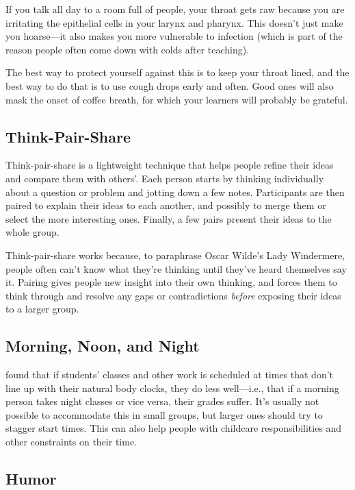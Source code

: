 If you talk all day to a room full of people, your throat gets raw
because you are irritating the epithelial cells in your larynx and
pharynx. This doesn't just make you hoarse---it also makes you more
vulnerable to infection (which is part of the reason people often come
down with colds after teaching).

The best way to protect yourself against this is to keep your throat
lined, and the best way to do that is to use cough drops early and
often. Good ones will also mask the onset of coffee breath, for which
your learners will probably be grateful.

\subsection*{Think-Pair-Share}

Think-pair-share is a lightweight technique that helps people refine
their ideas and compare them with others'. Each person starts by
thinking individually about a question or problem and jotting down a
few notes.  Participants are then paired to explain their ideas to
each another, and possibly to merge them or select the more
interesting ones. Finally, a few pairs present their ideas to the
whole group.

Think-pair-share works because, to paraphrase Oscar Wilde's Lady
Windermere, people often can't know what they're thinking until
they've heard themselves say it. Pairing gives people new insight into
their own thinking, and forces them to think through and resolve any
gaps or contradictions \emph{before} exposing their ideas to a larger
group.

\subsection*{Morning, Noon, and Night}

\cite{Smar2018} found that if students' classes and other work is
scheduled at times that don't line up with their natural body clocks,
they do less well---i.e., that if a morning person takes night classes
or vice versa, their grades suffer.  It's usually not possible to
accommodate this in small groups, but larger ones should try to
stagger start times.  This can also help people with childcare
responsibilities and other constraints on their time.

\subsection*{Humor}

